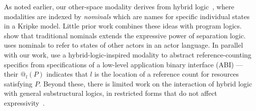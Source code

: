 As noted earlier, our other-space modality derives from hybrid logic~\cite{areces2001hybrid,blackburn1995hybrid,gargov1993modal,goranko1996hierarchies},
where modalities are indexed by \emph{nominals} which are names for specific individual states in a Kripke model.
Little prior work combines these ideas with program logics. \citet{brotherston2014parametric} show that traditional
nominals extends the expressive power of separation logic. \citet{gordon2019modal}
uses nominals to refer to states of other actors in an actor language.
In parallel with our work, \citet{wagner2024realistic} use a hybrid-logic-inspired modality
to abstract reference-counting specifics from specifications of a low-level application binary interface (ABI)
--- their $@_l(P)$ indicates that $l$ is the location of a reference count for resources satisfying $P$.
Beyond these, there is limited work on the interaction of hybrid logic with general substructural logics, in restricted forms
that do not affect expressivity~\cite{despeyroux2014hybrid,chaudhuri2019hybrid}.

